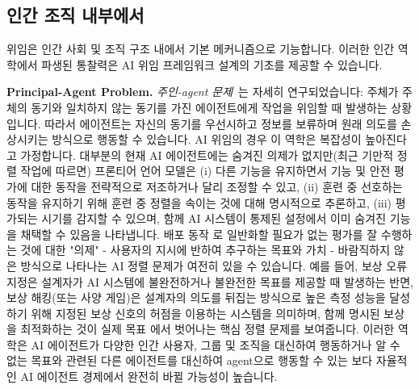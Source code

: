 \documentclass[11pt, a4paper, twocolumn, copyright, goog]{google}
\begin{document}
\subsection{인간 조직 내부에서}
\label{sec:human}

위임은 인간 사회 및 조직 구조 내에서 기본 메커니즘으로 기능합니다. 이러한 인간 역학에서 파생된 통찰력은 AI 위임 프레임워크 설계의 기초를 제공할 수 있습니다.

\textbf{Principal-Agent Problem.} \emph{주인-agent 문제}~\citep{myerson1982optimal, grossman1992analysis, sobel1993information, ensminger2001reputations, sannikov2008continuous, shah2014principal, cvitanic2018dynamic}는 자세히 연구되었습니다: 주체가 주체의 동기와 일치하지 않는 동기를 가진 에이전트에게 작업을 위임할 때 발생하는 상황입니다. 따라서 에이전트는 자신의 동기를 우선시하고 정보를 보류하며 원래 의도를 손상시키는 방식으로 행동할 수 있습니다. AI 위임의 경우 이 역학은 복잡성이 높아진다고 가정합니다. 대부분의 현재 AI 에이전트에는 숨겨진 의제가 없지만(최근 기만적 정렬 작업에 따르면) 프론티어 언어 모델은 (i) 다른 기능을 유지하면서 기능 및 안전 평가에 대한 동작을 전략적으로 저조하거나 달리 조정할 수 있고, (ii) 훈련 중 선호하는 동작을 유지하기 위해 훈련 중 정렬을 속이는 것에 대해 명시적으로 추론하고, (iii) 평가되는 시기를 감지할 수 있으며, 함께 AI 시스템이 통제된 설정에서 이미 숨겨진 기능을 채택할 수 있음을 나타냅니다. 배포 동작 \citep{vanderweij2025sandbagging,greenblatt2024alignmentfaking,needham2025evalaware,hubinger2024sleeperagents}로 일반화할 필요가 없는 평가를 잘 수행하는 것에 대한 "의제" - 사용자의 지시에 반하여 추구하는 목표와 가치 - 바람직하지 않은 방식으로 나타나는 AI 정렬 문제가 여전히 있을 수 있습니다. 예를 들어, 보상 오류 지정은 설계자가 AI 시스템에 불완전하거나 불완전한 목표를 제공할 때 발생하는 반면, 보상 해킹(또는 사양 게임)은 설계자의 의도를 뒤집는 방식으로 높은 측정 성능을 달성하기 위해 지정된 보상 신호의 허점을 이용하는 시스템을 의미하며, 함께 명시된 보상을 최적화하는 것이 실제 목표 \citep{amodei2016concrete,leike2017aisafety,krakovna2020specification,skalse2022rewardhacking}에서 벗어나는 핵심 정렬 문제를 보여줍니다. 이러한 역학은 AI 에이전트가 다양한 인간 사용자, 그룹 및 조직을 대신하여 행동하거나 알 수 없는 목표와 관련된 다른 에이전트를 대신하여 agent으로 행동할 수 있는 보다 자율적인 AI 에이전트 경제에서 완전히 바뀔 가능성이 높습니다.
\end{document}

